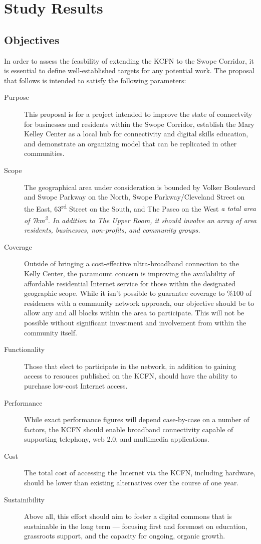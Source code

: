 \section{Study Results}
\subsection{Objectives}
In order to assess the feasbility of extending the KCFN to the Swope Corridor,
it is essential to define well-established targets for any potential work. The
proposal that follows is intended to satisfy the following parameters:
\begin{description}
\item[Purpose] This proposal is for a project intended to improve the state of
connectvity for businesses and residents within the Swope Corridor, establish
the Mary Kelley Center as a local hub for connectivity and digital skills
education, and demonstrate an organizing model that can be replicated in other
 communities.
\item[Scope] The geographical area under consideration is bounded by Volker
Boulevard and Swope Parkway on the North, Swope Parkway/Cleveland Street
on the East, 63\textsuperscript{rd} Street on the South, and The Paseo on the West
\em a total area of 7km\textsuperscript{2}. In addition to The Upper Room, it 
should involve an array of area residents, businesses, non-profits, and community groups.
\item[Coverage] Outside of bringing a cost-effective ultra-broadband connection
to the Kelly Center, the paramount concern is improving the availability of 
affordable residential Internet service for those within the designated geographic
scope. While it isn't possible to guarantee coverage to \%100 of residences with a community network approach,
our objective should be to allow any and all blocks within the area to participate. This
will not be possible without significant investment and involvement from within the
community itself.
\item[Functionality] Those that elect to participate in the network, in addition
to gaining access to resouces published on the KCFN, should have the
ability to purchase low-cost Internet access. 
\item[Performance] While exact performance figures will depend case-by-case on a
number of factors, the KCFN should enable broadband connectivity capable of supporting
telephony, web 2.0, and multimedia applications.
\item[Cost] The total cost of
accessing the Internet via the KCFN, including hardware, should be lower than existing
alternatives over the course of one year.
\item[Sustainibility] Above all, this effort should aim to foster a digital commons
that is sustainable in the long term --- focusing first and foremost on education, grassroots
support, and the capacity for ongoing, organic growth.
\end{description}
